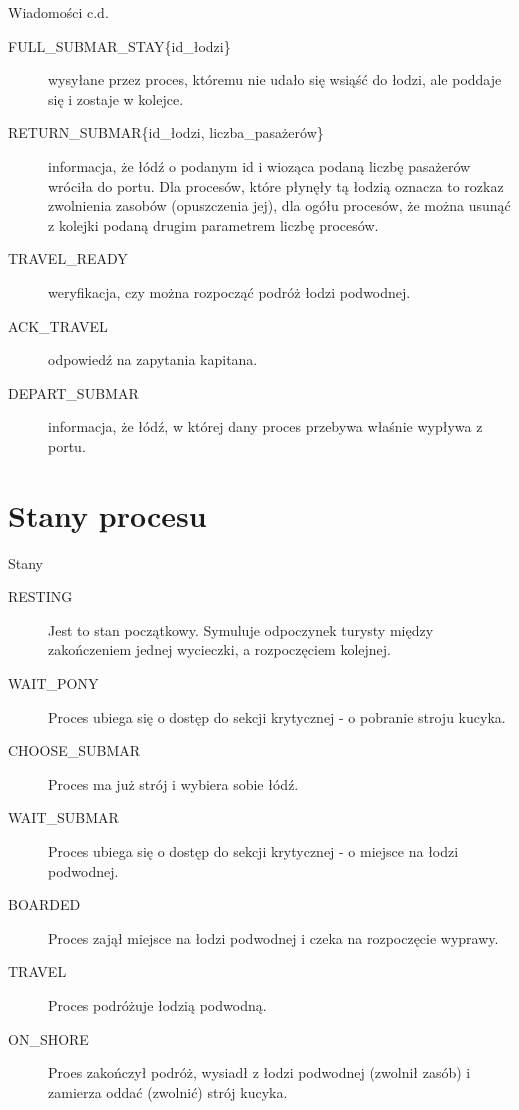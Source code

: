 \documentclass{beamer}
\begin{document}
\begin{frame}{Wiadomości c.d.}
    \internallinenumbers
    \begin{description}
        \item [FULL\_SUBMAR\_STAY\{id\_łodzi\}] wysyłane przez proces, któremu nie udało się wsiąść do łodzi, ale poddaje się i zostaje w kolejce.
        \item [RETURN\_SUBMAR\{id\_łodzi, liczba\_pasażerów\}] informacja, że łódź o podanym id i wioząca podaną liczbę pasażerów wróciła do portu. Dla procesów, które płynęły tą łodzią oznacza to rozkaz zwolnienia zasobów (opuszczenia jej), dla ogółu procesów, że można usunąć z kolejki podaną drugim parametrem liczbę procesów.
        \item [TRAVEL\_READY] weryfikacja, czy można rozpocząć podróż łodzi podwodnej.
        \item [ACK\_TRAVEL] odpowiedź na zapytania kapitana.
        \item [DEPART\_SUBMAR] informacja, że łódź, w której dany proces przebywa właśnie wypływa z portu.
    \end{description}
\end{frame}

\section{Stany procesu}
\begin{frame}{Stany}
    \internallinenumbers
    \resetlinenumber[1]
    \begin{description}
        \item [RESTING] Jest to stan początkowy. Symuluje odpoczynek turysty między zakończeniem jednej wycieczki, a rozpoczęciem kolejnej.
        \item [WAIT\_PONY] Proces ubiega się o dostęp do sekcji krytycznej - o pobranie stroju kucyka.
        \item [CHOOSE\_SUBMAR] Proces ma już strój i wybiera sobie łódź.
        \item [WAIT\_SUBMAR] Proces ubiega się o dostęp do sekcji krytycznej - o miejsce na łodzi podwodnej.
        \item [BOARDED] Proces zajął miejsce na łodzi podwodnej i czeka na rozpoczęcie wyprawy.
        \item [TRAVEL] Proces podróżuje łodzią podwodną.
        \item [ON\_SHORE] Proes zakończył podróż, wysiadł z łodzi podwodnej (zwolnił zasób) i zamierza oddać (zwolnić) strój kucyka.
    \end{description}

\end{frame}
\end{document}
